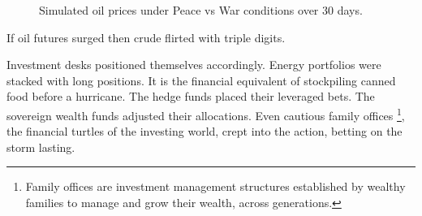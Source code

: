 \begin{figure}[H]
  \caption{Simulated oil prices under Peace vs War conditions over 30 days.}
\end{figure}

\medskip


If oil futures surged then crude flirted with triple digits.

Investment desks positioned themselves accordingly. 
Energy portfolios were stacked with long positions. It is the financial equivalent of stockpiling 
canned food before a hurricane. 
The hedge funds placed their leveraged bets. 
The sovereign wealth funds adjusted their allocations. 
Even cautious family offices
\footnote{Family offices are investment management structures established by wealthy families to manage and 
grow their wealth, across generations.}, 
the financial turtles of the investing world, crept into the action, 
betting on the storm lasting.

